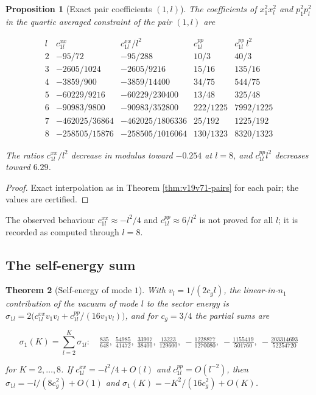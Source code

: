 \documentclass[11pt]{article}
\newtheorem{theorem}{Theorem}[section]
\newtheorem{proposition}[theorem]{Proposition}
\theoremstyle{remark}
\begin{document}
\begin{proposition}[Exact pair coefficients \((1,l)\)]
\label{prop:v19v74-pairs}
The coefficients of \(x_1^2x_l^2\) and \(p_1^2p_l^2\) in the quartic
averaged constraint of the pair \((1,l)\) are

\[
\begin{array}{c|c|c|c|c}
l&c^{xx}_{1l}&c^{xx}_{1l}/l^2&c^{pp}_{1l}&c^{pp}_{1l}\,l^2\\ \hline
2&-95/72&-95/288&10/3&40/3\\
3&-2605/1024&-2605/9216&15/16&135/16\\
4&-3859/900&-3859/14400&34/75&544/75\\
5&-60229/9216&-60229/230400&13/48&325/48\\
6&-90983/9800&-90983/352800&222/1225&7992/1225\\
7&-462025/36864&-462025/1806336&25/192&1225/192\\
8&-258505/15876&-258505/1016064&130/1323&8320/1323
\end{array}                                                            \tag{77.1}
\]

The ratios \(c^{xx}_{1l}/l^2\) decrease in modulus toward
\(-0.254\) at \(l=8\), and \(c^{pp}_{1l}l^2\) decreases toward
\(6.29\).
\end{proposition}

\begin{proof}
Exact interpolation as in Theorem \ref{thm:v19v71-pairs} for each
pair; the values are certified.
\end{proof}

The observed behaviour \(c^{xx}_{1l}\approx-l^2/4\) and
\(c^{pp}_{1l}\approx6/l^2\) is not proved for all \(l\); it is
recorded as computed through \(l=8\).

\subsection{The self-energy sum}

\begin{theorem}[Self-energy of mode \(1\)]
\label{thm:v19v74-self-energy}
With \(v_l=1/(2c_gl)\), the linear-in-\(n_1\) contribution of the
vacuum of mode \(l\) to the sector energy is
\(\sigma_{1l}=2\bigl(c^{xx}_{1l}v_1v_l+c^{pp}_{1l}/(16v_1v_l)\bigr)\),
and for \(c_g=3/4\) the partial sums are

\[
 \sigma_1(K)=\sum_{l=2}^K\sigma_{1l}:\quad
 \tfrac{835}{648},\ \tfrac{54985}{41472},\ \tfrac{33907}{38400},\ \tfrac{13223}{129600},\
 -\tfrac{1228877}{1270080},\ -\tfrac{1155419}{501760},\ -\tfrac{203314693}{52254720}
                                                                    \tag{77.2}
\]

for \(K=2,\dots,8\).  If \(c^{xx}_{1l}=-l^2/4+O(l)\) and
\(c^{pp}_{1l}=O(l^{-2})\), then
\(\sigma_{1l}=-l/(8c_g^2)+O(1)\) and \(\sigma_1(K)=-K^2/(16c_g^2)+O(K)\).
\end{theorem}
\end{document}
